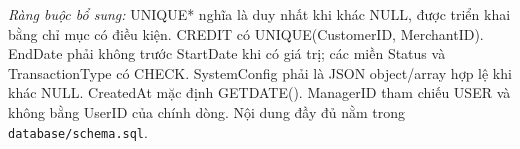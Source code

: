 \textit{Ràng buộc bổ sung:} UNIQUE* nghĩa là duy nhất khi khác NULL, được triển khai bằng chỉ mục có điều kiện. CREDIT có UNIQUE(CustomerID, MerchantID). EndDate phải không trước StartDate khi có giá trị; các miền Status và TransactionType có CHECK. SystemConfig phải là JSON object/array hợp lệ khi khác NULL. CreatedAt mặc định GETDATE(). ManagerID tham chiếu USER và không bằng UserID của chính dòng. Nội dung đầy đủ nằm trong \texttt{database/schema.sql}.
